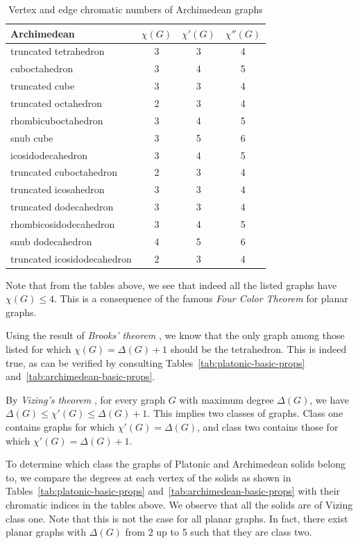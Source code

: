 \begin{table}[H]
\centering
\begin{tabular}{l@{\hspace{1.5cm}}ccc}
\toprule
\textbf{Archimedean} & \textbf{$\chi(G)$} & \textbf{$\chi'(G)$} & \textbf{$\chi''(G)$} \\
\midrule
truncated tetrahedron & 3 & 3 & 4 \\
cuboctahedron & 3 & 4 & 5 \\
truncated cube & 3 & 3 & 4 \\
truncated octahedron & 2 & 3 & 4 \\
rhombicuboctahedron & 3 & 4 & 5 \\
snub cube & 3 & 5 & 6 \\
icosidodecahedron & 3 & 4 & 5 \\
truncated cuboctahedron & 2 & 3 & 4 \\
truncated icosahedron & 3 & 3 & 4 \\
truncated dodecahedron & 3 & 3 & 4 \\
rhombicosidodecahedron & 3 & 4 & 5 \\
snub dodecahedron & 4 & 5 & 6 \\
truncated icosidodecahedron & 2 & 3 & 4 \\
\bottomrule
\end{tabular}
\caption{Vertex and edge chromatic numbers of Archimedean graphs}
\label{tab:archimedean-chrom-nums}
\end{table}

Note that from the tables above, we see that indeed all the listed graphs have $\chi(G) \leq 4$. This is a consequence of the famous \textit{Four Color Theorem} \cite{appelhaken76} for planar graphs.

Using the result of \textit{Brooks' theorem} \cite{brooks41}, we know that the only graph among those listed for which $\chi(G) = \Delta(G) + 1$ should be the tetrahedron. This is indeed true, as can be verified by consulting Tables~\ref{tab:platonic-basic-props} and~\ref{tab:archimedean-basic-props}. 

By \textit{Vizing's theorem} \cite{misra92}, for every graph $G$ with maximum degree $\Delta(G)$, we have $\Delta(G) \leq \chi'(G) \leq \Delta(G) + 1$. This implies two classes of graphs. Class one contains graphs for which $\chi'(G) = \Delta(G)$, and class two contains those for which $\chi'(G) = \Delta(G) + 1$.

To determine which class the graphs of Platonic and Archimedean solids belong to, we compare the degrees at each vertex of the solids as shown in Tables~\ref{tab:platonic-basic-props} and~\ref{tab:archimedean-basic-props} with their chromatic indices in the tables above. We observe that all the solids are of Vizing class one. Note that this is not the case for all planar graphs. In fact, there exist planar graphs with $\Delta(G)$ from 2 up to 5 such that they are class two.

